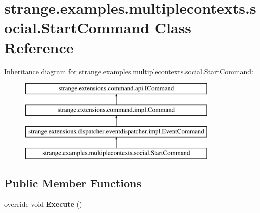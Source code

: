 \hypertarget{classstrange_1_1examples_1_1multiplecontexts_1_1social_1_1_start_command}{\section{strange.\-examples.\-multiplecontexts.\-social.\-Start\-Command Class Reference}
\label{classstrange_1_1examples_1_1multiplecontexts_1_1social_1_1_start_command}
}
Inheritance diagram for strange.\-examples.\-multiplecontexts.\-social.\-Start\-Command\-:\begin{figure}[H]
\begin{center}
\leavevmode
\includegraphics[height=4.000000cm]{classstrange_1_1examples_1_1multiplecontexts_1_1social_1_1_start_command}
\end{center}
\end{figure}
\subsection*{Public Member Functions}
\begin{DoxyCompactItemize}
\item 
\hypertarget{classstrange_1_1examples_1_1multiplecontexts_1_1social_1_1_start_command_adee001f4c7475e4442a445271b376f71}{override void {\bfseries Execute} ()}\label{classstrange_1_1examples_1_1multiplecontexts_1_1social_1_1_start_command_adee001f4c7475e4442a445271b376f71}

\end{DoxyCompactItemize}
